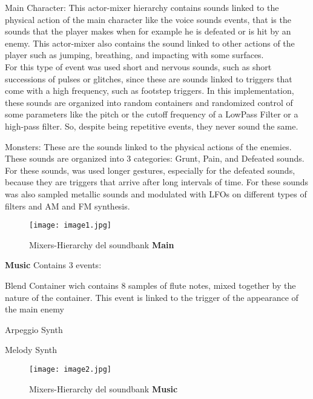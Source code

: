 \begin{compactitem}
\begin{compactitem}
				\item Main Character: This actor-mixer hierarchy contains sounds linked to the physical action of the main character like the voice sounds events, that is the sounds that the player makes when for example he is defeated or is hit by an enemy. This actor-mixer also contains the sound linked to other actions of the player such as jumping, breathing, and impacting with some surfaces. \\
				For this type of event was used short and nervous sounds, such as short successions of pulses or glitches, since these are sounds linked to triggers that come with a high frequency, such as footstep triggers.
				In this implementation, these sounds are organized into random containers and randomized control of some parameters like the pitch or the cutoff frequency of a LowPass Filter or a high-pass filter. So, despite being repetitive events, they never sound the same.

				\item Monsters: These are the sounds linked to the physical actions of the enemies. These sounds are organized into 3 categories: Grunt, Pain, and Defeated sounds. \\
				For these sounds, was used longer gestures, especially for the defeated sounds, because they are triggers that arrive after long intervals of time. For these sounds was also sampled metallic sounds and modulated with LFOs on different types of filters and AM and FM synthesis.
			\end{compactitem}

		\begin{figure}[h]
			\begin{center}
				\texttt{[image: image1.jpg]}
				\caption{Mixers-Hierarchy del soundbank \textbf{Main}}
			\end{center}
		\end{figure}

		\item \textbf{Music} Contains 3 events:
			\begin{compactitem}
				\item Blend Container wich contains 8 samples of flute notes, mixed together by the nature of the container. This event is linked to the trigger of the appearance of the main enemy
				\item Arpeggio Synth
				\item Melody Synth
			\end{compactitem}
		\begin{figure}[h]
			\begin{center}
				\texttt{[image: image2.jpg]}
				\caption{Mixers-Hierarchy del soundbank \textbf{Music}}
			\end{center}
		\end{figure}


\end{compactitem}
